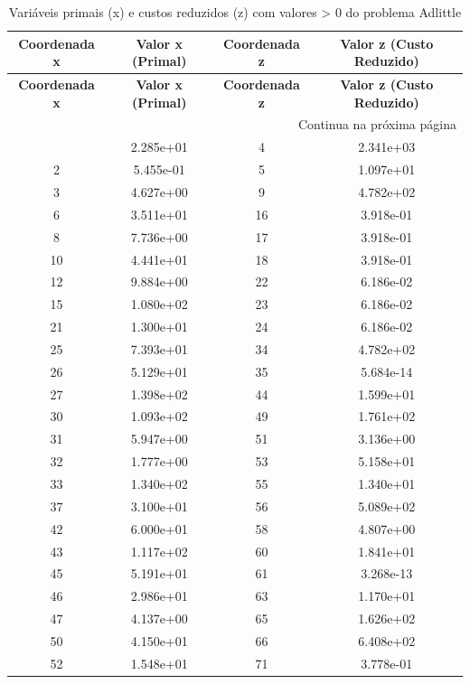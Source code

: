 \documentclass[12pt]{article}
\begin{document}
\begin{longtable}{@{}cccc@{}}
\caption{Variáveis primais (x) e custos reduzidos (z) com valores > 0 do problema Adlittle} \\
\toprule
\textbf{Coordenada x} & \textbf{Valor x (Primal)} & \textbf{Coordenada z} & \textbf{Valor z (Custo Reduzido)} \\
\midrule
\endfirsthead

\toprule
\textbf{Coordenada x} & \textbf{Valor x (Primal)} & \textbf{Coordenada z} & \textbf{Valor z (Custo Reduzido)} \\
\midrule
\endhead

\midrule \multicolumn{4}{r}{{Continua na próxima página}} \\ \midrule
\endfoot

\bottomrule
\endlastfoot
1 & 2.285e+01 & 4 & 2.341e+03 \\
2 & 5.455e-01 & 5 & 1.097e+01 \\
3 & 4.627e+00 & 9 & 4.782e+02 \\
6 & 3.511e+01 & 16 & 3.918e-01 \\
8 & 7.736e+00 & 17 & 3.918e-01 \\
10 & 4.441e+01 & 18 & 3.918e-01 \\
12 & 9.884e+00 & 22 & 6.186e-02 \\
15 & 1.080e+02 & 23 & 6.186e-02 \\
21 & 1.300e+01 & 24 & 6.186e-02 \\
25 & 7.393e+01 & 34 & 4.782e+02 \\
26 & 5.129e+01 & 35 & 5.684e-14 \\
27 & 1.398e+02 & 44 & 1.599e+01 \\
30 & 1.093e+02 & 49 & 1.761e+02 \\
31 & 5.947e+00 & 51 & 3.136e+00 \\
32 & 1.777e+00 & 53 & 5.158e+01 \\
33 & 1.340e+02 & 55 & 1.340e+01 \\
37 & 3.100e+01 & 56 & 5.089e+02 \\
42 & 6.000e+01 & 58 & 4.807e+00 \\
43 & 1.117e+02 & 60 & 1.841e+01 \\
45 & 5.191e+01 & 61 & 3.268e-13 \\
46 & 2.986e+01 & 63 & 1.170e+01 \\
47 & 4.137e+00 & 65 & 1.626e+02 \\
50 & 4.150e+01 & 66 & 6.408e+02 \\
52 & 1.548e+01 & 71 & 3.778e-01 \\

\end{longtable}
\end{document}
